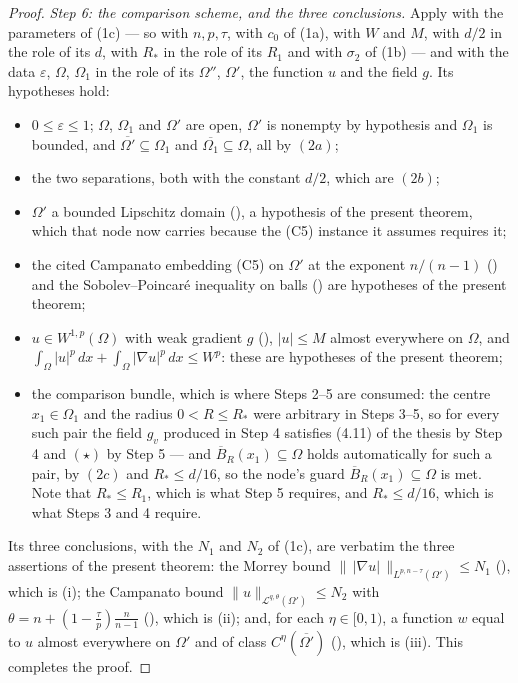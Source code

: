\begin{proof}
\emph{Step 6: the comparison scheme, and the three conclusions.}  Apply
 with the parameters of (1c) --- so with
$n,p,\tau$, with $c_0$ of (1a), with $W$ and $M$, with $d/2$ in the role of its
$d$, with $R_\ast$ in the role of its $R_1$ and with $\sigma_2$ of (1b) --- and
with the data $\varepsilon$, $\Omega$, $\Omega_1$ in the role of
its $\Omega''$, $\Omega'$, the function $u$ and the field $g$.  Its hypotheses
hold:
\begin{itemize}
\item $0\le\varepsilon\le1$; $\Omega$, $\Omega_1$ and $\Omega'$ are
  open, $\Omega'$ is nonempty by hypothesis and $\Omega_1$ is bounded, and
  $\overline{\Omega'}\subseteq\Omega_1$ and
  $\overline{\Omega_1}\subseteq\Omega$, all by $(2a)$;
\item the two separations, both with the constant $d/2$, which are $(2b)$;
\item $\Omega'$ a bounded Lipschitz domain
  (), a hypothesis of the present theorem,
  which that node now carries because the (C5) instance it assumes requires it;
\item the cited Campanato embedding (C5) on $\Omega'$ at the exponent
  $n/(n-1)$ () and the Sobolev--Poincar\'e
  inequality on balls () are hypotheses of the
  present theorem;
\item $u\in W^{1,p}(\Omega)$ with weak gradient $g$ (),
  $|u|\le M$ almost everywhere on $\Omega$, and
  $\int_\Omega|u|^p\,dx+\int_\Omega|\nabla u|^p\,dx\le W^p$: these are
  hypotheses of the present theorem;
\item the comparison bundle, which is where Steps 2--5 are consumed: the
  centre $x_1\in\Omega_1$ and the radius $0<R\le R_\ast$ were arbitrary in
  Steps 3--5, so for every such pair the field $g_v$ produced in
  Step 4 satisfies (4.11) of the thesis by Step 4 and $(\star)$ by Step 5 --- and
  $\overline B_R(x_1)\subseteq\Omega$ holds automatically for such a pair, by
  $(2c)$ and $R_\ast\le d/16$, so the node's guard
  $\overline B_R(x_1)\subseteq\Omega$ is met.  Note that $R_\ast\le R_1$,
  which is what Step 5 requires, and $R_\ast\le d/16$, which is what Steps 3
  and 4 require.
\end{itemize}
Its three conclusions, with the $N_1$ and $N_2$ of (1c), are verbatim the three
assertions of the present theorem: the Morrey bound
$\|\,|\nabla u|\,\|_{L^{p,n-\tau}(\Omega')}\le N_1$
(), which is (i); the Campanato bound
$\|u\|_{\mathcal L^{q,\theta}(\Omega')}\le N_2$ with
$\theta=n+(1-\frac\tau p)\frac n{n-1}$ (), which is
(ii); and, for each $\eta\in[0,1)$, a function $w$ equal to $u$ almost
everywhere on $\Omega'$ and of class $C^\eta(\overline{\Omega'})$
(), which is (iii).  This completes the proof.
\end{proof}
